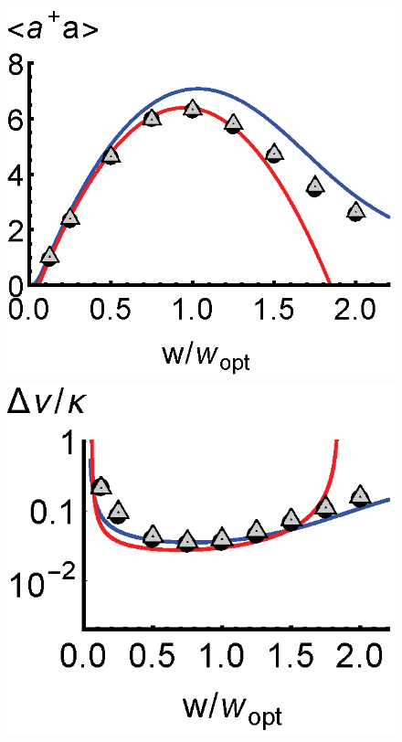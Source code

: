 \documentclass[aps,prl,twocolumn,
superscriptaddress,groupedaddress]{revtex4}
\begin{document}
\begin{figure}
\begin{center}
	\hspace{-5.0mm} \includegraphics[scale =0.38] {N40Superradianceada.eps}
	\hspace{-5.0mm} \includegraphics[scale =0.38] {N40SuperradianceLW.eps}

\end{center}
\end{figure}
\end{document}
